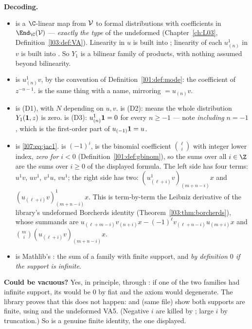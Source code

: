 \begin{dictionary}
\textbf{Decoding.}
\begin{itemize}
\item {} is a $\C$-linear map from $\mathcal{V}$ to formal distributions
  with coefficients in $\End_\C(\lsevenV)$ --- \emph{exactly the type} of the undeformed
   (Chapter~\ref{ch:L03}, Definition~\ref{l03:def:VA}). Linearity in $u$ is built into
  ; linearity of each $u^1_{(n)}$ in $v$ is built into . So $Y_1$ is a
  bilinear family of products, with nothing assumed beyond bilinearity.
\item {} is $u^1_{(n)}v$, by the convention  of
  Definition~\ref{l01:def:mode}: the coefficient of $z^{-n-1}$.  is the same
  thing with a name, mirroring  $= u_{(n)}v$.
\item {} is (D1), with $N$ depending on $u,v$.  is (D2):
   means the whole distribution $Y_1(\mathbf{1},z)$ is zero.
   is (D3): $u^1_{(n)}\mathbf{1} = 0$ for every $n\ge-1$ --- note \emph{including}
  $n = -1$, which is the first-order part of $u_{(-1)}\mathbf{1} = u$.
\item {} is \eqref{l07:eq:jac1}.  is $(-1)^i$,  is the
  binomial coefficient $\binom{\ell}{i}$ with integer lower index, \emph{zero for $i<0$}
  (Definition~\ref{l01:def:gbinom}), so the sums over all $i\in\Z$ are the sums over $i\ge0$ of the
  displayed formula. The left side has four terms: $u^1v$, $uv^1$, $v^1u$, $vu^1$; the right side
  has two: $(u^1_{(\ell+i)}v)_{(m+n-i)}x$ and $(u_{(\ell+i)}v)^1_{(m+n-i)}x$. This is
  term-by-term the Leibniz derivative of the library's undeformed Borcherds identity
   (Theorem~\ref{l03:thm:borcherds}), whose summands are
  $u_{(\ell+m-i)}v_{(n+i)}x - (-1)^\ell v_{(\ell+n-i)}u_{(m+i)}x$ and $\binom mi(u_{(\ell+i)}v)_{(m+n-i)}x$.
\item {} is Mathlib's : the sum of a family with finite support, and \emph{by
  definition $0$ if the support is infinite}.
\end{itemize}

\textbf{Could  be vacuous?} Yes, in principle, through : if one of the
two families had infinite support, its  would be $0$ by fiat and the axiom would
degenerate. The library proves that this does not happen:  and
 (same file) show both supports are finite, using
 and the undeformed VA5. (Negative $i$ are killed by ; large $i$ by
truncation.) So  is a genuine finite identity, the one displayed.


\end{dictionary}
